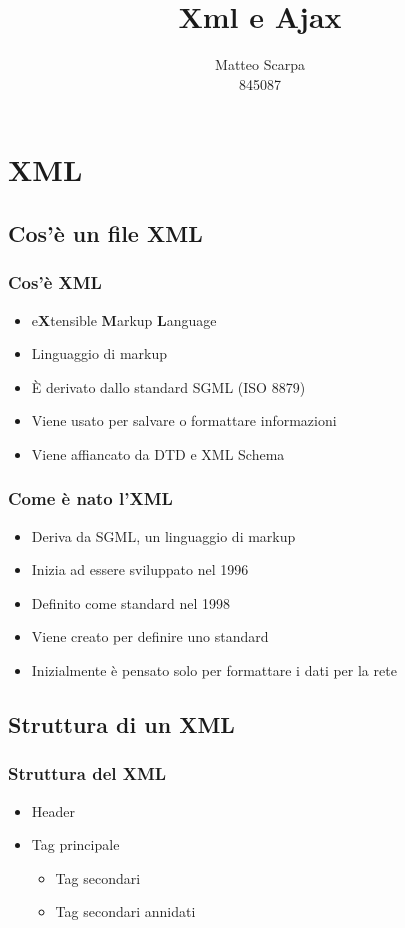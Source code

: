 \documentclass{beamer}
\title{Xml e Ajax}
\author{Matteo Scarpa\\ 845087}
\date{}
\institute{Università Ca'Foscari}
\begin{document}
\begin{frame}
   \maketitle
\end{frame}

\section{XML}

\subsection{Cos'è un file XML}
\begin{frame}
    \frametitle{Cos'è XML}
    \begin{itemize}
        \item <1->e\textbf{X}tensible \textbf{M}arkup \textbf{L}anguage
        \item <2->Linguaggio di markup
        \item <3->È derivato dallo standard SGML (ISO 8879)
        \item <4->Viene usato per salvare o formattare informazioni
        \item <5->Viene affiancato da DTD e XML Schema
    \end{itemize}
\end{frame}

\begin{frame}
    \frametitle{Come è nato l'XML}
    \begin{itemize}
    \item Deriva da SGML, un linguaggio di markup
    \item Inizia ad essere sviluppato nel 1996
    \item Definito come standard nel 1998
    \item Viene creato per definire uno standard
    \item Inizialmente è pensato solo per formattare i dati per la rete
    \end{itemize}

\end{frame}

\subsection{Struttura di un XML}
\begin{frame}
    \frametitle{Struttura del XML}
    \begin{itemize}
        \item Header
        \item Tag principale
        \begin{itemize}
            \item Tag secondari
            \item Tag secondari annidati
        \end{itemize}
    \end{itemize}
\end{frame}
\end{document}
